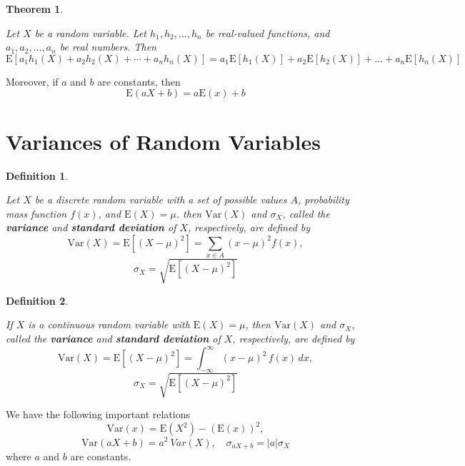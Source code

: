 \documentclass[landscape, 20pt]{extreport}
\newtheorem{theorem}{Theorem}[chapter]
\theoremstyle{definition}
\newtheorem{definition}{Definition}[chapter]
\theoremstyle{definition}
\theoremstyle{definition}
\theoremstyle{definition}
\theoremstyle{remark}
\begin{document}
\begin{theorem}
\protect\hypertarget{thm:unlabeled-div-9}{}\label{thm:unlabeled-div-9}

\emph{Let \(X\) be a random variable. Let
\(h_1, h_2, . . . , h_n\) be real-valued functions, and
\(a_1, a_2, \ldots, a_n\) be real numbers. Then
\[\mathrm{E}[a_1 h_1(X) + a_2 h_2(X) + \cdots + a_n h_n(X)] = a_1 \mathrm{E}[h_1(X)] + a_2 \mathrm{E}[h_2(X)] + \ldots +
    a_n \mathrm{E}[h_n(X)]\]}

\end{theorem}

Moreover, if \(a\) and \(b\) are constants, then
\[\mathrm{E}(aX +b) = a\mathrm{E}(x) + b\]

\hypertarget{variances-of-random-variables}{%
\section{Variances of Random Variables}\label{variances-of-random-variables}}

\begin{definition}
\protect\hypertarget{def:unlabeled-div-10}{}\label{def:unlabeled-div-10}

\emph{Let \(X\) be a discrete random variable with a set of
possible values \(A\), probability mass function \(f(x)\), and
\(\mathrm{E}(X) = \mu\). then \(\mathrm{Var}(X)\) and \(\sigma_X\), called the
\textbf{variance} and \textbf{standard deviation} of \(X\), respectively, are
defined by
\[\mathrm{Var}(X) = \mathrm{E}[(X- \mu)^2] = \sum_{x \in A} (x - \mu)^2 f(x),\]
\[\sigma_X = \sqrt{\mathrm{E}[(X- \mu)^2]}\]}

\end{definition}

\begin{definition}
\protect\hypertarget{def:unlabeled-div-11}{}\label{def:unlabeled-div-11}

\emph{If \(X\) is a continuous random variable with
\(\mathrm{E}(X) = \mu\), then \(\mathrm{Var}(X)\) and \(\sigma_X\), called the
\textbf{variance} and \textbf{standard deviation} of \(X\), respectively, are
defined by
\[\mathrm{Var}(X) = \mathrm{E}[(X- \mu)^2] =  \int_{-\infty}^\infty (x - \mu)^2\, f(x)\, dx ,\]
\[\sigma_X = \sqrt{\mathrm{E}[(X- \mu)^2]}\]}

\end{definition}

We have the following important relations
\[\mathrm{Var}(x) = \mathrm{E}(X^2) - (\mathrm{E}(x))^2 ,\]
\[\mathrm{Var}(aX + b) = a^2\ Var(X), \quad   \sigma_{aX + b}= |a|\sigma_X\]
where \(a\) and \(b\) are constants.
\end{document}
